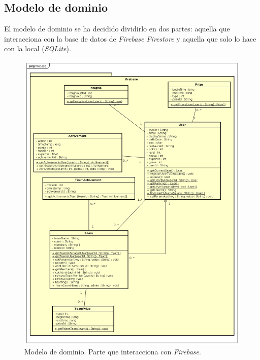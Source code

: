 \documentclass[twoside]{report}
\begin{document}
\subsection{Modelo de dominio}

El modelo de dominio se ha decidido dividirlo en dos partes: aquella que interacciona con la base de datos de \textit{Firebase Firestore} y aquella que solo lo hace con la local (\textit{SQLite}). 

\begin{figure}[H]
\begin{center}
\includegraphics[scale=0.45]{images/clasesFirebase.png}
\caption{Modelo de dominio. Parte que interacciona con \textit{Firebase}.}
\end{center}
\end{figure}
\end{document}
